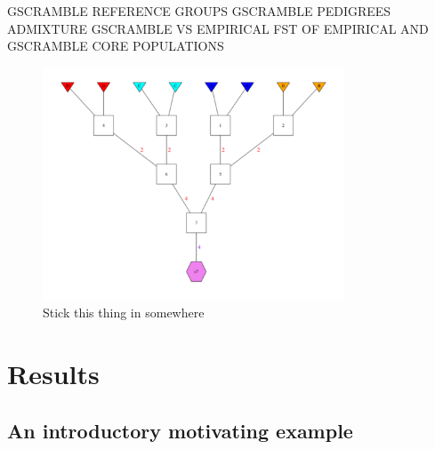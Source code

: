 GSCRAMBLE REFERENCE GROUPS
GSCRAMBLE PEDIGREES
ADMIXTURE GSCRAMBLE VS EMPIRICAL
FST OF EMPIRICAL AND GSCRAMBLE CORE POPULATIONS




\begin{figure}
\begin{center}
\includegraphics[width=0.8\textwidth]{images/gsp4-700.pdf}
\end{center}
\caption[]{Stick this thing in somewhere}
\end{figure}


\section*{Results}

\subsection*{An introductory motivating example}

